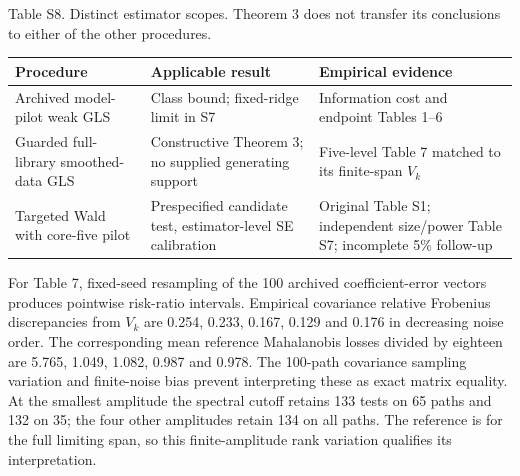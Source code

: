\documentclass[
  american,
  11pt,
]{article}
\begin{document}
\begin{center}
\begin{minipage}{\linewidth}
Table S8. Distinct estimator scopes. Theorem 3 does not transfer its
conclusions to either of the other procedures.

\small\setlength{\tabcolsep}{3pt}
\begin{tabular}{@{}
  >{\raggedright\arraybackslash}p{}
  >{\raggedright\arraybackslash}p{}
  >{\raggedright\arraybackslash}p{}@{}}
\toprule\noalign{}
\begin{minipage}[b]{\linewidth}\raggedright
Procedure
\end{minipage} & \begin{minipage}[b]{\linewidth}\raggedright
Applicable result
\end{minipage} & \begin{minipage}[b]{\linewidth}\raggedright
Empirical evidence
\end{minipage} \\
\midrule\noalign{}
Archived model-pilot weak GLS & Class bound; fixed-ridge limit in S7 &
Information cost and endpoint Tables 1--6 \\
Guarded full-library smoothed-data GLS & Constructive Theorem 3; no
supplied generating support & Five-level Table 7 matched to its
finite-span \(V_k\) \\
Targeted Wald with core-five pilot & Prespecified candidate test,
estimator-level SE calibration & Original Table S1; independent
size/power Table S7; incomplete 5\% follow-up \\
\bottomrule
\end{tabular}
\end{minipage}
\end{center}

For Table 7, fixed-seed resampling of the 100 archived coefficient-error
vectors produces pointwise risk-ratio intervals. Empirical covariance
relative Frobenius discrepancies from \(V_k\) are 0.254, 0.233, 0.167,
0.129 and 0.176 in decreasing noise order. The corresponding mean
reference Mahalanobis losses divided by eighteen are 5.765, 1.049,
1.082, 0.987 and 0.978. The 100-path covariance sampling variation and
finite-noise bias prevent interpreting these as exact matrix equality.
At the smallest amplitude the spectral cutoff retains 133 tests on 65
paths and 132 on 35; the four other amplitudes retain 134 on all paths.
The reference is for the full limiting span, so this finite-amplitude
rank variation qualifies its interpretation.
\end{document}
